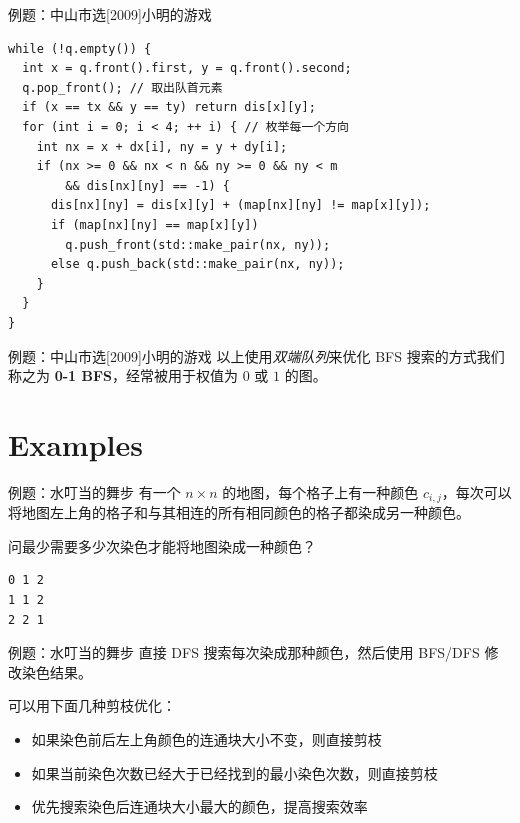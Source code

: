 \documentclass[12pt,aspectratio=169]{beamer}
\begin{document}
\begin{frame}[fragile]{例题：中山市选[2009]小明的游戏}
  \begin{verbatim}
while (!q.empty()) {
  int x = q.front().first, y = q.front().second;
  q.pop_front(); // 取出队首元素
  if (x == tx && y == ty) return dis[x][y];
  for (int i = 0; i < 4; ++ i) { // 枚举每一个方向
    int nx = x + dx[i], ny = y + dy[i];
    if (nx >= 0 && nx < n && ny >= 0 && ny < m
        && dis[nx][ny] == -1) {
      dis[nx][ny] = dis[x][y] + (map[nx][ny] != map[x][y]);
      if (map[nx][ny] == map[x][y])
        q.push_front(std::make_pair(nx, ny));
      else q.push_back(std::make_pair(nx, ny));
    }
  }
}
  \end{verbatim}
\end{frame}

\begin{frame}[fragile]{例题：中山市选[2009]小明的游戏}
  以上使用\textit{双端队列}来优化 BFS 搜索的方式我们称之为 \textbf{0-1 BFS}，经常被用于权值为 $0$ 或 $1$ 的图。
\end{frame}

\section[比较有意思的例题]{Examples}

\begin{frame}[fragile]{例题：水叮当的舞步}
  有一个 $n \times n$ 的地图，每个格子上有一种颜色 $c_{i,j}$，每次可以将地图左上角的格子和与其相连的所有相同颜色的格子都染成另一种颜色。

  问最少需要多少次染色才能将地图染成一种颜色？

  \begin{verbatim}
0 1 2
1 1 2
2 2 1
  \end{verbatim}

\end{frame}

\begin{frame}[fragile]{例题：水叮当的舞步}
  直接 DFS 搜索每次染成那种颜色，然后使用 BFS/DFS 修改染色结果。

  可以用下面几种剪枝优化：

  \begin{itemize}
    \item 如果染色前后左上角颜色的连通块大小不变，则直接剪枝
    \item 如果当前染色次数已经大于已经找到的最小染色次数，则直接剪枝
    \item 优先搜索染色后连通块大小最大的颜色，提高搜索效率
  \end{itemize}
\end{frame}
\end{document}
